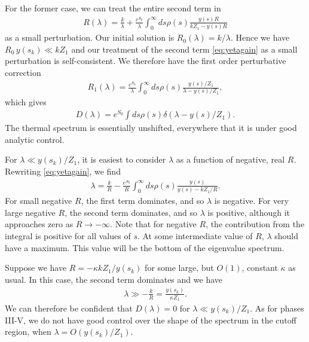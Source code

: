 \documentclass[11pt]{article}
\newcommand{\smax}{s_k}
\numberwithin{equation}{section}
\begin{document}
For the former case, we can treat the entire second term in
\begin{align} \label{eq:yetagain}
R(\lambda) = \frac{k}{\lambda}  +  \frac{e^{S_0}}{\lambda}\int_{0}^\infty ds \rho(s) \frac{y(s) R}{k Z_1 - y(s) R}
\end{align}
as a small perturbation. Our initial solution is $R_0 (\lambda) = k/\lambda$. Hence we have $R_0\, y(\smax) \ll k Z_1$ and our treatment of the second term \eqref{eq:yetagain} as a small perturbation is self-consistent. We therefore have the first order perturbative correction
\begin{align} \label{eq:R1lambda5}
R_1(\lambda) = \frac{e^{S_0}}{\lambda}\int_{0}^\infty ds \rho(s) \frac{y(s)/Z_1}{\lambda - y(s)/Z_1},
\end{align}
which gives
\begin{align}
D(\lambda) = e^{S_0} \int ds \rho(s) \delta( \lambda - y(s)/ Z_1).
\end{align}
The thermal spectrum is essentially unshifted, everywhere that it is under good analytic control.

For $\lambda \ll y(\smax)/Z_1$, it is easiest to consider $\lambda$ as a function of negative, real $R$. Rewriting \eqref{eq:yetagain}, we find
\begin{align}
\lambda = \frac{k}{R} -  \frac{e^{S_0}}{R} \int_{0}^\infty ds \rho(s) \frac{y(s) }{y(s) - k Z_1 / R}.
\end{align}
For small negative $R$, the first term dominates, and so $\lambda$ is negative. For very large negative $R$, the second term dominates, and so $\lambda$ is positive, although it approaches zero as $R \to - \infty$. Note that for negative $R$, the contribution from the integral is positive for all values of $s$. At some intermediate value of $R$, $\lambda$ should have a maximum. This value will be the bottom of the eigenvalue spectrum.

Suppose we have $R = - \kappa k Z_1 / y(\smax)$ for some large, but $O(1)$, constant $\kappa$ as usual. In this case, the second term dominates and we have
\begin{align}
\lambda \gg - \frac{k}{R} = \frac{y(\smax)}{\kappa Z_1}.
\end{align}
We can therefore be confident that $D(\lambda) = 0$ for $\lambda \ll y(\smax)/Z_1$. As for  phases III-V, we do not have good control over the shape of the spectrum in the cutoff region, when $\lambda = O(y(\smax)/Z_1)$.
\end{document}
